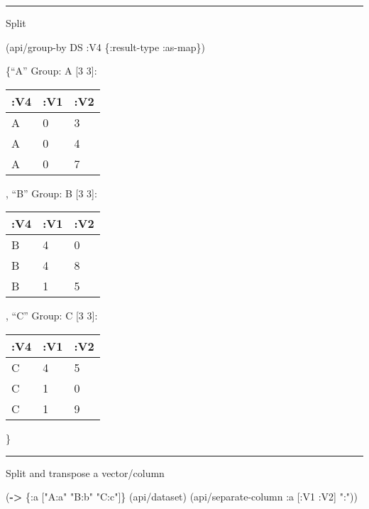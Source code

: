 \documentclass[]{article}
\newenvironment{Shaded}{\begin{snugshade}}{\end{snugshade}}
\newcommand{\AttributeTok}[1]{\textcolor[rgb]{0.77,0.63,0.00}{#1}}
\newcommand{\KeywordTok}[1]{\textcolor[rgb]{0.13,0.29,0.53}{\textbf{#1}}}
\newcommand{\NormalTok}[1]{#1}
\newcommand{\StringTok}[1]{\textcolor[rgb]{0.31,0.60,0.02}{#1}}
\begin{document}
\begin{center}\rule{0.5\linewidth}{0.5pt}\end{center}

Split

\begin{Shaded}
\begin{Highlighting}[]
\NormalTok{(api/group-by DS }\AttributeTok{:V4}\NormalTok{ \{}\AttributeTok{:result-type} \AttributeTok{:as-map}\NormalTok{\})}
\end{Highlighting}
\end{Shaded}

\{``A'' Group: A {[}3 3{]}:

\begin{longtable}[]{@{}lll@{}}
\toprule
:V4 & :V1 & :V2\tabularnewline
\midrule
\endhead
A & 0 & 3\tabularnewline
A & 0 & 4\tabularnewline
A & 0 & 7\tabularnewline
\bottomrule
\end{longtable}

, ``B'' Group: B {[}3 3{]}:

\begin{longtable}[]{@{}lll@{}}
\toprule
:V4 & :V1 & :V2\tabularnewline
\midrule
\endhead
B & 4 & 0\tabularnewline
B & 4 & 8\tabularnewline
B & 1 & 5\tabularnewline
\bottomrule
\end{longtable}

, ``C'' Group: C {[}3 3{]}:

\begin{longtable}[]{@{}lll@{}}
\toprule
:V4 & :V1 & :V2\tabularnewline
\midrule
\endhead
C & 4 & 5\tabularnewline
C & 1 & 0\tabularnewline
C & 1 & 9\tabularnewline
\bottomrule
\end{longtable}

\}

\begin{center}\rule{0.5\linewidth}{0.5pt}\end{center}

Split and transpose a vector/column

\begin{Shaded}
\begin{Highlighting}[]
\NormalTok{(}\KeywordTok{->}\NormalTok{ \{}\AttributeTok{:a}\NormalTok{ [}\StringTok{"A:a"} \StringTok{"B:b"} \StringTok{"C:c"}\NormalTok{]\}}
\NormalTok{    (api/dataset)}
\NormalTok{    (api/separate-column }\AttributeTok{:a}\NormalTok{ [}\AttributeTok{:V1} \AttributeTok{:V2}\NormalTok{] }\StringTok{":"}\NormalTok{))}
\end{Highlighting}
\end{Shaded}
\end{document}
